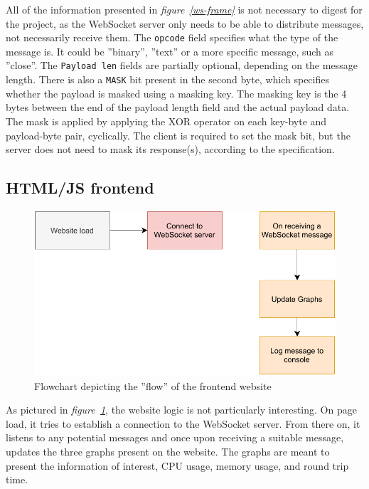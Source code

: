 All of the information presented in \textit{figure~\ref{ws-frame}} is not necessary to digest for the project, as the WebSocket server only needs to be able to distribute messages, not necessarily receive them. The \lstinline{opcode} field specifies what the type of the message is. It could be ''binary'', ''text'' or a more specific message, such as ''close''\cite{ws-howto}. The \lstinline{Payload len} fields are partially optional, depending on the message length\cite{ws-howto}. There is also a \lstinline{MASK} bit present in the second byte, which specifies whether the payload is masked using a masking key\cite{ws-howto}. The masking key is the 4 bytes between the end of the payload length field and the actual payload data. The mask is applied by applying the XOR operator on each key-byte and payload-byte pair, cyclically\cite{ws-howto}. The client is required to set the mask bit, but the server does not need to mask its response(s), according to the specification\cite{ws-howto}.

\subsection{HTML/JS frontend}

\begin{figure}[H]
	\begin{center}
		\includegraphics[width=\textwidth]{./doc/html_js_frontend.pdf}
		\caption{Flowchart depicting the ''flow'' of the frontend website}
		\label{html-frontend}
	\end{center}
\end{figure}

As pictured in \textit{figure~\ref{html-frontend}}, the website logic is not particularly interesting. On page load, it tries to establish a connection to the WebSocket server. From there on, it listens to any potential messages and once upon receiving a suitable message, updates the three graphs present on the website. The graphs are meant to present the information of interest, CPU usage, memory usage, and round trip time.

